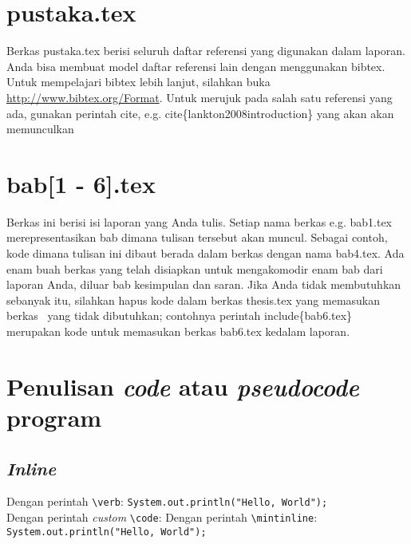     \section{pustaka.tex}
    Berkas pustaka.tex berisi seluruh daftar referensi yang digunakan dalam
    laporan.
    Anda bisa membuat model daftar referensi lain dengan menggunakan bibtex.
    Untuk mempelajari bibtex lebih lanjut, silahkan buka
    \url{http://www.bibtex.org/Format}.
    Untuk merujuk pada salah satu referensi yang ada, gunakan perintah \bslash
    cite, e.g. \bslash cite\{lankton2008introduction\} yang akan akan memunculkan
    \cite{lankton2008introduction}


    \section{bab[1 - 6].tex}
    Berkas ini berisi isi laporan yang Anda tulis.
    Setiap nama berkas e.g. bab1.tex merepresentasikan bab dimana tulisan tersebut
    akan muncul.
    Sebagai contoh, kode dimana tulisan ini dibaut berada dalam berkas dengan nama
    bab4.tex.
    Ada enam buah berkas yang telah disiapkan untuk mengakomodir enam bab dari
    laporan Anda, diluar bab kesimpulan dan saran.
    Jika Anda tidak membutuhkan sebanyak itu, silahkan hapus kode dalam berkas
    thesis.tex yang memasukan berkas \latex~yang tidak dibutuhkan;  contohnya
    perintah \bslash include\{bab6.tex\} merupakan kode untuk memasukan berkas
    bab6.tex kedalam laporan.

    \section{Penulisan \textit{code} atau \textit{pseudocode} program}

    \subsection{\textit{Inline}}

    Dengan perintah \verb|\verb|: \verb|System.out.println("Hello, World");| \\
    Dengan perintah \textit{custom} \verb|\code|: 
    Dengan perintah \verb|\mintinline|: \texttt{System.out.println("Hello, World"); }

